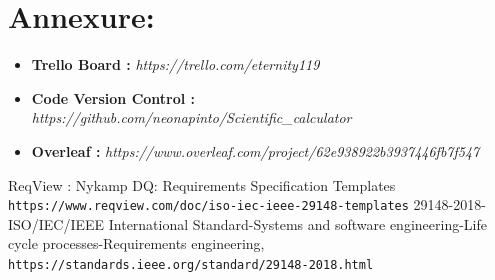 \documentclass[letterpaper, 11pt]{article}
\begin{document}
\section{Annexure:}
    \begin{itemize}
      \item \textbf{Trello Board :} \textit{https://trello.com/eternity119}
      \item \textbf{Code Version Control :} \textit{https://github.com/neonapinto/Scientific\_calculator}
      \item \textbf{Overleaf :} \textit{https://www.overleaf.com/project/62e938922b3937446fb7f547}
    \end{itemize}
        
\begin{thebibliography}{}
ReqView : Nykamp DQ: Requirements Specification Templates
\\\texttt{https://www.reqview.com/doc/iso-iec-ieee-29148-templates}
29148-2018-ISO/IEC/IEEE International Standard-Systems and software engineering-Life cycle processes-Requirements engineering,
\\\texttt{https://standards.ieee.org/standard/29148-2018.html}
\end{thebibliography}
\end{document}
